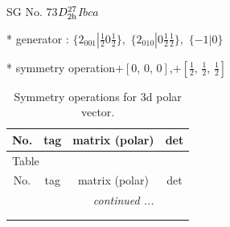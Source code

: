 \documentclass[fleqn,8pt]{jsarticle}
\begin{document}
\setcounter{MaxMatrixCols}{32}

\renewcommand{\tablename}{Table~}
\renewcommand{\figurename}{Figure~}
\begin{center}
\LARGE
SG No. 73\quad$D_{\rm 2h}^{27}$\quad$Ibca$\quad[ orthorhombic ]
\end{center}

* generator : $\{2{}_{001}|\frac{1}{2} 0 \frac{1}{2}\},\,\,\{2{}_{010}|0 \frac{1}{2} \frac{1}{2}\},\,\,\{-1|0\}$

* symmetry operation\quad$+\left[ 0,\, 0,\, 0 \right]$,\quad $+\left[ \frac{1}{2},\, \frac{1}{2},\, \frac{1}{2} \right]$
\renewcommand{\arraystretch}{1.3}
\begin{longtable}{cccc}
\caption{Symmetry operations for 3d polar vector.}
 \\
 \hline \hline
No. & tag & matrix (polar) & det \\ \hline \endfirsthead

\multicolumn{3}{l}{\tablename\ \thetable{}} \\
 \hline \hline
No. & tag & matrix (polar) & det \\ \hline \endhead

 \hline \hline
\multicolumn{3}{r}{\footnotesize\it continued ...} \\ \endfoot

 \hline \hline
\multicolumn{3}{r}{} \\ \endlastfoot


\end{longtable}
\end{document}
